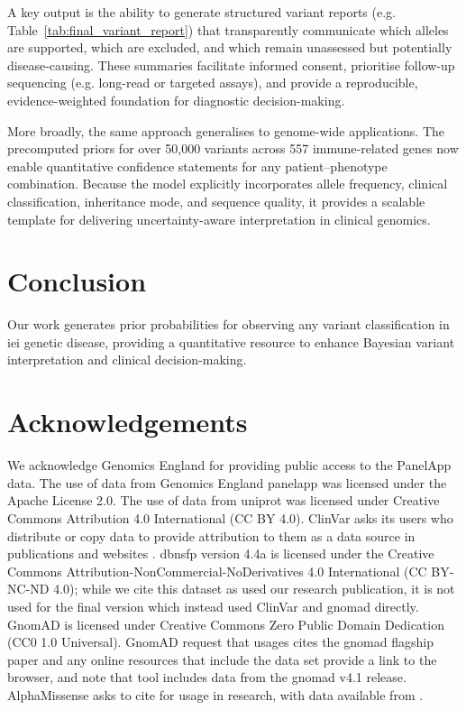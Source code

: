 A key output is the ability to generate structured variant reports (e.g. Table~\ref{tab:final_variant_report}) that transparently communicate which alleles are supported, which are excluded, and which remain unassessed but potentially disease-causing. These summaries facilitate informed consent, prioritise follow-up sequencing (e.g. long-read or targeted assays), and provide a reproducible, evidence-weighted foundation for diagnostic decision-making.

More broadly, the same approach generalises to genome-wide applications. The precomputed priors for over 50,000 variants across 557 immune-related genes now enable quantitative confidence statements for any patient–phenotype combination. Because the model explicitly incorporates allele frequency, clinical classification, inheritance mode, and sequence quality, it provides a scalable template for delivering uncertainty-aware interpretation in clinical genomics.

\section{Conclusion}
Our work generates prior probabilities for observing any variant classification in \ac{iei} genetic disease, providing a quantitative resource to enhance Bayesian variant interpretation and clinical decision-making.

\section*{Acknowledgements}
\noindent
We acknowledge Genomics England for providing public access to the PanelApp data.
The use of data from Genomics England panelapp was licensed under the Apache License 2.0.
The use of data from \ac{uniprot} was licensed under Creative Commons Attribution 4.0 International (CC BY 4.0).
ClinVar asks its users who distribute or copy data to provide attribution to them as a data source in publications and websites \cite{landrum_clinvar_2018}.
\ac{dbnsfp} version 4.4a is licensed under the Creative Commons Attribution-NonCommercial-NoDerivatives 4.0 International (CC BY-NC-ND 4.0); while we cite this dataset as used our research publication, it is not used for the final version which instead used ClinVar and \ac{gnomad} directly.
GnomAD is licensed under  Creative Commons  Zero Public Domain Dedication (CC0 1.0 Universal).
GnomAD request that usages cites the \ac{gnomad} flagship paper \cite{karczewski2020mutational}
and any online resources that include the data set provide a link to the browser, and note that tool includes data from the \ac{gnomad} v4.1 release.
AlphaMissense asks to cite \citet{cheng_accurate_2023} for usage in research, with data available from \citet{jun_cheng_2023_8208688}.

